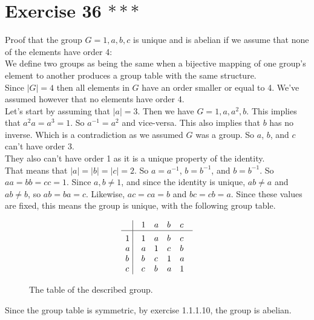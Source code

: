 \documentclass{article}
\begin{document}
    \section*{Exercise 36 $***$}
    Proof that the group $G = {1, a, b, c}$ is unique and is abelian
    if we assume that none of the elements have order 4: \\
    We define two groups as being the same when a bijective mapping
    of one group's element to another produces a group table with the same
    structure. \\
    Since $|G| = 4$ then all elements in $G$ have an order smaller or equal
    to 4. We've assumed however that no elements have order 4. \\
    Let's start by assuming that $|a| = 3$.
    Then we have $G = {1, a, a^2, b}$.
    This implies that $a^2a = a^3 = 1$.
    So $a^{-1} = a^2$ and vice-versa.
    This also implies that $b$ has no inverse.
    Which is a contradiction as we assumed $G$ was a group.
    So $a$, $b$, and $c$ can't have order 3. \\
    They also can't have order 1 as it is a unique property of the identity. \\
    That means that $|a| = |b| = |c| = 2$.
    So $a = a^{-1}$, $b = b^{-1}$, and $b = b^{-1}$.
    So $aa = bb = cc = 1$.
    Since $a,b \neq 1$, and since the identity is unique,
    $ab \neq a$ and $ab \neq b$,
    so $ab = ba = c$.
    Likewise, $ac = ca = b$ and $bc = cb = a$.
    Since these values are fixed, this means the group is unique, with the
    following group table.

    \begin{figure}[H]
        \centering

        \[\vbox{\tabskip0.5em\offinterlineskip
        \halign{\strut$#$\hfil\ \tabskip1em\vrule&&$#$\hfil\cr
        ~   & 1   & a   & b & c \cr
        \noalign{\hrule}\vrule height 12pt width 0pt
        1   & 1 & a & b & c \cr 
        a   & a & 1 & c & b \cr 
        b   & b & c & 1 & a \cr 
        c   & c & b & a & 1 \cr
        }}\]

        \caption{\label{fig:figure1} The table of the described group.}
    \end{figure}

    Since the group table is symmetric, by exercise 1.1.1.10,
    the group is abelian.
\end{document}
